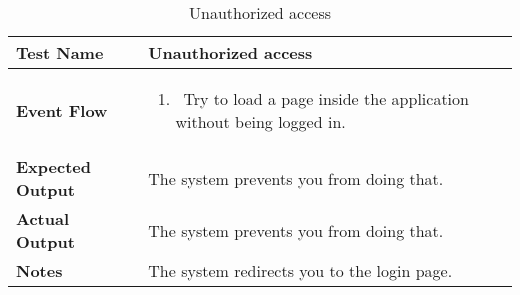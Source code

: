 \begin{table}[h]	
	\centering
	\def\arraystretch{1.5}
	\begin{tabular}{|m{7cm}|m{7cm}|}
		\hline
		\textbf{Test Name}            &  Unauthorized access  \\ \hline
		\textbf{Event Flow}             &  
			\begin{enumerate}
				\item~Try to load a page inside the application without being logged in.
			\end{enumerate}
		 \\ \hline
		\textbf{Expected Output}  &  The system prevents you from doing that.   \\ \hline
		\textbf{Actual Output}       &  The system prevents you from doing that.   \\ \hline
		\textbf{Notes} & The system redirects you to the login page. \\ \hline
	\end{tabular}
	\caption{Unauthorized access}
\end{table}


